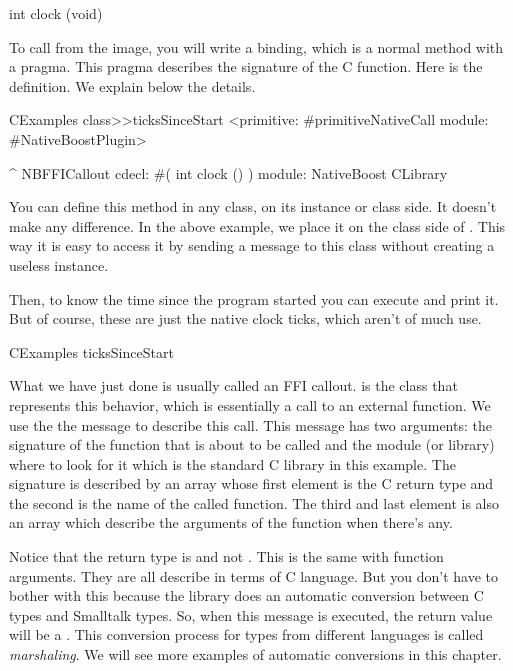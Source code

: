 \documentclass[a4paper,10pt,twoside]{book}
\begin{document}
\begin{code}{}
int clock (void)
\end{code}

To call  from the image, you will write a binding, which is a normal method with a  pragma. This pragma describes the signature of the C function. Here is the definition. We  explain below the details.

\begin{code}{}
CExamples class>>ticksSinceStart
	<primitive: #primitiveNativeCall module: #NativeBoostPlugin>
	
	^ NBFFICallout cdecl: #( int clock () ) module: NativeBoost CLibrary
\end{code}


You can define this method in any class, on its instance or class side.
It doesn't make any difference. 
In the above example, we place it on the class side of . 
This way it is easy to access it by sending a message to this class without creating a useless instance. 

Then, to know the time since the program started you can execute and print it.
But of course, these are just the native clock ticks, which aren't of much use. 
\begin{code}{}
CExamples ticksSinceStart
\end{code}

What we have just done is usually called an FFI callout. 
 is the class that represents this behavior, which is essentially a call to an external function.
We use the the  message  to describe this call. 
This message has two arguments: the signature of the function that is about to be called and the module (or library) where to look for it which is the standard C library in this example. 
The signature is described by an array whose first element is the C return type and the second is the name of the called function.
The third and last element is also an array which describe the arguments of the function when there's any. 

Notice that the return type is  and not . 
This is the same with function arguments. 
They are all describe in terms of C language.
But you don't have to bother with this because the \Spock library does an automatic conversion between C types and Smalltalk types.
So, when this message is executed, the return value will be a . 
This conversion process for types from different languages is called \emph{marshaling}.
We will see more examples of automatic conversions in this chapter. 
\end{document}
